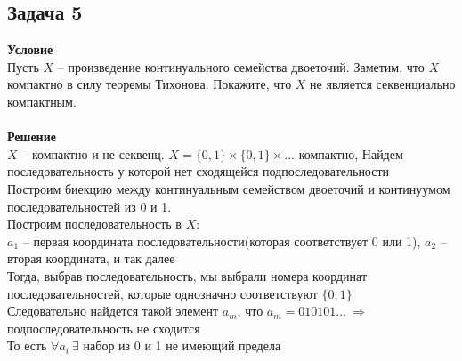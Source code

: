 		\subsection*{Задача 5}
		\textbf{Условие}\\
		Пусть $X$ -- произведение континуального семейства двоеточий. Заметим, что $X$ компактно в силу теоремы Тихонова. Покажите, что $X$ не является секвенциально компактным.\\
		\\
		\textbf{Решение}\\
		$X$ -- компактно и не секвенц. $X = \{0, 1\} \times \{0, 1\} \times \ldots$ компактно, Найдем последовательность у которой нет сходящейся подпоследовательности\\
		Построим биекцию между континуальным семейством двоеточий и континуумом последовательностей из 0 и 1.\\
		Построим последовательность в $X$:\\
		$a_1$ -- первая координата последовательности(которая соответствует 0 или 1), $a_2$ -- вторая координата, и так далее\\
		Тогда, выбрав последовательность, мы выбрали номера координат последовательностей, которые однозначно соответствуют $\{0,1\}$\\
		Следовательно найдется такой элемент $a_m$, что $a_m = 010101\ldots\ \Rightarrow$ подпоследовательность не сходится\\
		То есть $\forall a_i\ \exists$ набор из 0 и 1 не имеющий предела
		
		\begin{comment}
		Сопоставим каждому двоеточию некую последовательность из 0 и 1 (так мы построили биекцию с континуальным множеством)\\
		Пусть $a_i$ -- множество(континульная последовательность) $i$-ых элементов последовательностей, которые мы поставили в соответствие. Так как $X$ -- произведение континуального числа двоеточий, то и в каждом множестве(последовательности) континуум элементов, тогда там есть подпоследовательность(подмножество, являющееся последовательнотью) $0101010\ldots$, которая ни к чему не сходится(то есть не скходится ни к 0, ни к 1).
		\end{comment}
		
		\begin{comment}
		Каждое двоеточие занумеруем последовательностью нулей и единиц (так мы построили биекцию с континуальным множеством)\\
		Докажем от противного, что $X$ секвенциально компактно, тогда рассмотрим последовательность, для которой нет сходящейся подпоследовательности (существование такой последовательности следует из предположения).\\
		Заметим, что каждое двоеточие соответствует набору 0 и 1, и каждому набору 0 и 1 соответствует какое-то двоеточие(иначе это не биекция). Тогда есть элемент, выражающийся через 0 и 1 как: $0101010\ldots$, то есть бесконечная последовательность из чередующихся 0 и 1. Но у этой последовательности нет сходящейся подпоследовательности, откуда следует, что $X$ не секвенциально компактен.
		\end{comment}
		